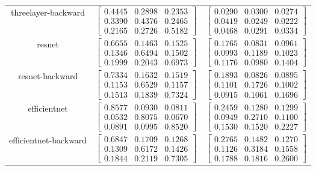 \documentclass{article} %
\begin{document}
\begin{table}
\begin{tabular}{ccc}
threelayer-backward & $\begin{bmatrix}0.4445 & 0.2898 & 0.2353\\0.3390 & 0.4376 & 0.2465\\0.2165 & 0.2726 & 0.5182\end{bmatrix}$ & $\begin{bmatrix}0.0290 & 0.0300 & 0.0274\\0.0419 & 0.0249 & 0.0222\\0.0468 & 0.0291 & 0.0334\end{bmatrix}$\\
resnet & $\begin{bmatrix}0.6655 & 0.1463 & 0.1525\\0.1346 & 0.6494 & 0.1502\\0.1999 & 0.2043 & 0.6973\end{bmatrix}$ & $\begin{bmatrix}0.1765 & 0.0831 & 0.0961\\0.0993 & 0.1189 & 0.1023\\0.1176 & 0.0980 & 0.1404\end{bmatrix}$\\
resnet-backward & $\begin{bmatrix}0.7334 & 0.1632 & 0.1519\\0.1153 & 0.6529 & 0.1157\\0.1513 & 0.1839 & 0.7324\end{bmatrix}$ & $\begin{bmatrix}0.1893 & 0.0826 & 0.0895\\0.1101 & 0.1726 & 0.1002\\0.0915 & 0.1061 & 0.1696\end{bmatrix}$\\
efficientnet & $\begin{bmatrix}0.8577 & 0.0930 & 0.0811\\0.0532 & 0.8075 & 0.0670\\0.0891 & 0.0995 & 0.8520\end{bmatrix}$ & $\begin{bmatrix}0.2459 & 0.1280 & 0.1299\\0.0949 & 0.2710 & 0.1100\\0.1530 & 0.1520 & 0.2227\end{bmatrix}$\\
efficientnet-backward & $\begin{bmatrix}0.6847 & 0.1709 & 0.1268\\0.1309 & 0.6172 & 0.1426\\0.1844 & 0.2119 & 0.7305\end{bmatrix}$ & $\begin{bmatrix}0.2765 & 0.1482 & 0.1270\\0.1126 & 0.3184 & 0.1558\\0.1788 & 0.1816 & 0.2600\end{bmatrix}$\\

\end{tabular}
\end{table}
\end{document}
